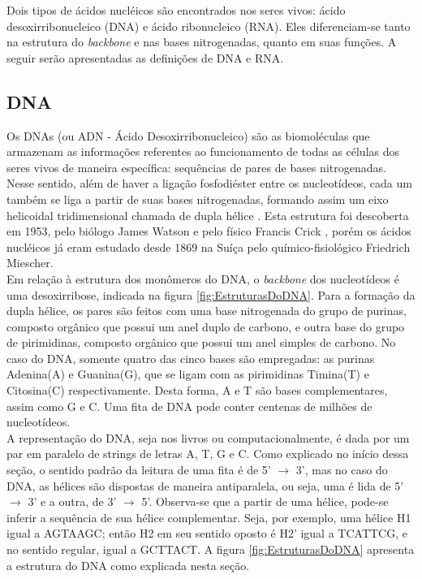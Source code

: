 \indent Dois tipos de ácidos nucléicos são encontrados nos seres vivos: ácido desoxirribonucleico (DNA) e ácido ribonucleico (RNA). Eles diferenciam-se tanto na estrutura do \textit{backbone} e nas bases nitrogenadas, quanto em suas funções. A seguir serão apresentadas as definições de DNA e RNA.

\subsection{DNA} \label{aceidosNucleicos:dna}

\indent Os DNAs (ou ADN - Ácido Desoxirribonucleico) são as biomoléculas que armazenam as informações referentes ao funcionamento de todas as células dos seres vivos de maneira específica: sequências de pares de bases nitrogenadas. Nesse sentido, além de haver a ligação fosfodiéster entre os nucleotídeos, cada um também se liga a partir de suas bases nitrogenadas, formando assim um eixo helicoidal tridimensional chamada de dupla hélice \cite{setubal97}. Esta estrutura foi descoberta em 1953, pelo biólogo James Watson e pelo físico Francis Crick \cite{dnadiscovery08}, porém os ácidos nucléicos já eram estudado desde 1869 na Suíça pelo químico-fisiológico Friedrich Miescher. \\

\indent Em relação à estrutura dos monômeros do DNA, o \textit{backbone} dos nucleotídeos é uma desoxirribose, indicada na figura \ref{fig:EstruturasDoDNA}. Para a formação da dupla hélice, os pares são feitos com uma base nitrogenada do grupo de purinas, composto orgânico que possui um anel duplo de carbono, e outra base do grupo de pirimidinas, composto orgânico que possui um anel simples de carbono. No caso do DNA, somente quatro das cinco bases são empregadas: as purinas Adenina(A) e Guanina(G), que se ligam com as pirimidinas Timina(T) e Citosina(C) respectivamente. Desta forma, A e T são bases complementares, assim como G e C. Uma fita de DNA pode conter centenas de milhões de nucleotídeos. \\

\indent A representação do DNA, seja nos livros ou computacionalmente, é dada por um par em paralelo de strings de letras A, T, G e C. Como explicado no início dessa seção, o sentido padrão da leitura de uma fita é de 5' $\rightarrow$ 3', mas no caso do DNA, as hélices são dispostas de maneira antiparalela, ou seja, uma é lida de 5' $\rightarrow$ 3' e a outra, de 3' $\rightarrow$ 5'. Observa-se que a partir de uma hélice, pode-se inferir a sequência de sua hélice complementar. Seja, por exemplo, uma hélice H1 igual a AGTAAGC; então H2 em seu sentido oposto é H2' igual a TCATTCG, e no sentido regular, igual a GCTTACT. A figura \ref{fig:EstruturasDoDNA} apresenta a estrutura do DNA como explicada nesta seção. \\

